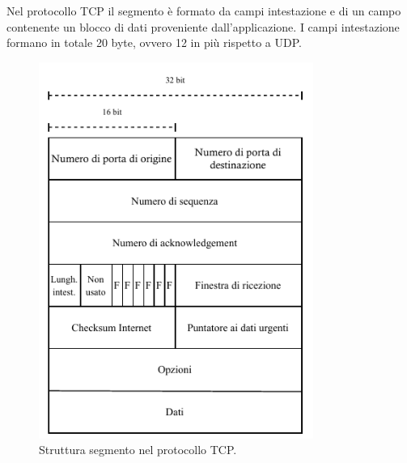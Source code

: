 \documentclass[a4paper]{article}
\begin{document}
	\noindent
	Nel protocollo TCP il segmento è formato da campi intestazione e di un campo contenente un blocco di dati proveniente dall’applicazione. I campi intestazione formano in totale 20 byte, ovvero 12 in più rispetto a UDP.
	\begin{figure}[!htp]
		\centering
		\includegraphics[width=0.8\textwidth]{img/segmento_tcp.pdf}
		\caption{Struttura segmento nel protocollo TCP.}
	\end{figure}
\end{document}

